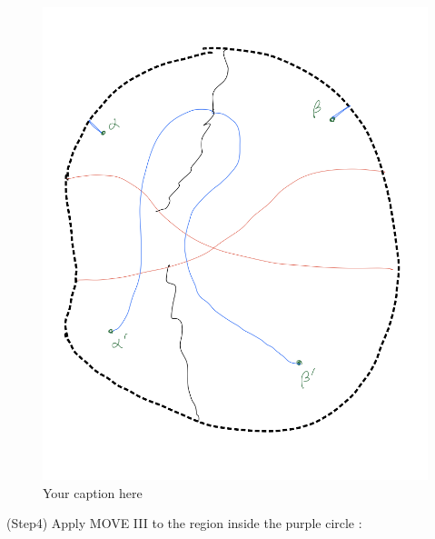 \begin{figure}[H] %
    \centering
    \includegraphics[width=\linewidth]{diagrams/definition10/7.png} %
    \caption{Your caption here}
    \label{fig:your-label}
\end{figure}

(Step4) Apply MOVE \RN{3} to the region inside the purple circle :

